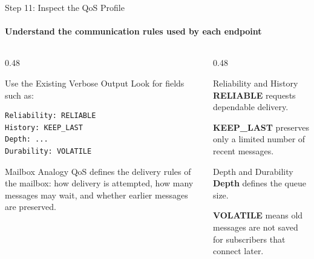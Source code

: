 \begin{frame}[fragile]{Step 11: Inspect the QoS Profile}
\framesubtitle{Understand the communication rules used by each endpoint}

\footnotesize

\begin{columns}[T,onlytextwidth]

    \begin{column}{0.48\textwidth}
        \begin{block}{Use the Existing Verbose Output}
            Look for fields such as:

\begin{verbatim}
Reliability: RELIABLE
History: KEEP_LAST
Depth: ...
Durability: VOLATILE
\end{verbatim}
        \end{block}

        \vspace{0.15cm}

        \begin{exampleblock}{Mailbox Analogy}
            QoS defines the delivery rules of the mailbox: how delivery is attempted,
            how many messages may wait, and whether earlier messages are preserved.
        \end{exampleblock}
    \end{column}

    \begin{column}{0.48\textwidth}
        \begin{block}{Reliability and History}
            \textbf{RELIABLE} requests dependable delivery.

            \vspace{0.15cm}
            \textbf{KEEP\_LAST} preserves only a limited number of
            recent messages.
        \end{block}
        
        \begin{block}{Depth and Durability}
            \textbf{Depth} defines the queue size.

            \vspace{0.15cm}
            \textbf{VOLATILE} means old messages are not saved for
            subscribers that connect later.
        \end{block}
    \end{column}

\end{columns}

\end{frame}

